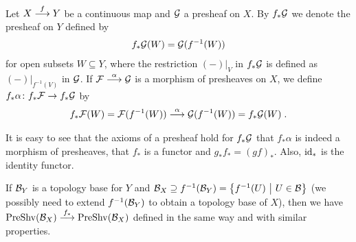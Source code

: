 \documentclass[a4paper,parskip=half,numbers=enddot, DIV=12]{scrreprt}
\begin{document}
    \begin{defi} 
        Let $X\morphism[f] Y$ be a continuous map and $\mathcal{G}$ a presheaf on $X$. By $f_*\mathcal{G}$ we denote the presheaf on $Y$ defined by 
        \begin{align*}
            f_*\mathcal{G}(W) = \mathcal{G}(f^{-1}(W))
        \end{align*}
        for open subsets $W\subseteq Y$, where the restriction $(-)|_V$ in $f_*\mathcal{G}$ is defined as $(-)|_{f^{-1}(V)}$ in $\mathcal{G}$. If $\Ff\morphism[\alpha] \Gg$ is a morphism of presheaves on $X$, we define $f_*\alpha\colon f_*\Ff\morphism f_*\Gg$ by 
        \begin{align*}
        	f_*\Ff(W) = \Ff(f^{-1}(W)) \morphism[\alpha] \Gg(f^{-1}(W)) = f_*\Gg(W)\;.
        \end{align*}
    \end{defi}
    \begin{fact}
        It is easy to see that the axioms of a presheaf hold for $f_*\mathcal{G}$ that $f_*\alpha$ is indeed a morphism of presheaves, that $f_*$ is a functor and $g_*f_* = (gf)_*$. Also, $\operatorname{id}_*$ is the identity functor.
    \end{fact}
    \begin{rem*}
        If $\mathcal{B}_Y$ is a topology base for $Y$ and $\mathcal{B}_X\supseteq f^{-1}(\mathcal{B}_Y) = \left\{f^{-1}(U) \ \middle|\  U\in\mathcal{B}\right\}$ (we possibly need to extend $f^{-1}(\mathcal{B}_Y)$ to obtain a topology base of $X$), then we have $\cat{PreShv}(\Bb_X) \morphism[f_*]\cat{PreShv}(\Bb_X)$ defined in the same way and with similar properties.
    \end{rem*}
\end{document}
